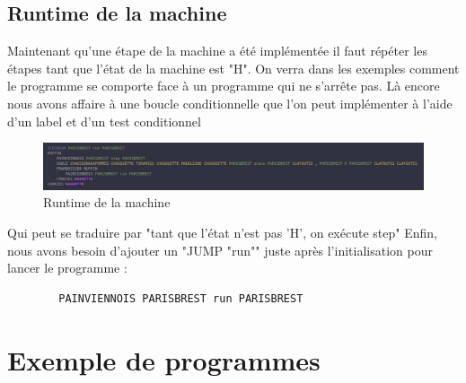 \documentclass[11pt,colorlinks=true,a4paper]{article}
\begin{document}
    \subsection{Runtime de la machine}
    Maintenant qu'une étape de la machine a été implémentée il faut répéter les étapes tant que l'état de la machine est "H". 
    On verra dans les exemples comment le programme se comporte face à un programme qui ne s'arrête pas. Là encore nous avons affaire 
    à une boucle conditionnelle que l'on peut implémenter à l'aide d'un label et d'un test conditionnel\par \bigskip
    \begin{figure}[H]
        \center 
        \includegraphics[width=\textwidth]{img/runtime.png}
        \caption{Runtime de la machine}
    \end{figure}
    Qui peut se traduire par "tant que l'état n'est pas 'H', on exécute step"
    Enfin, nous avons besoin d'ajouter un "JUMP "run"" juste après l'initialisation pour lancer le programme : 
    \begin{lstlisting}
        PAINVIENNOIS PARISBREST run PARISBREST
    \end{lstlisting}

    \section{Exemple de programmes}
\end{document}
